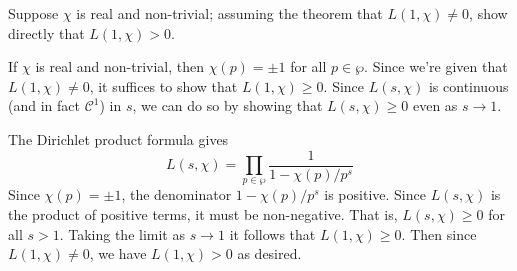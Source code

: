 \documentclass[12 pt, letterpaper]{hmcpset}
\begin{document}
\pagebreak

\begin{problem}[S \& S \S 8.4 \#12]
	Suppose $\chi$ is real and non-trivial; assuming the theorem that $L(1, \chi) \neq 0$, show directly that $L(1, \chi) > 0$.
\end{problem}

\begin{solution}
	If $\chi$ is real and non-trivial, then $\chi(p) = \pm 1$ for all $p \in \wp$. Since we're given that $L(1, \chi) \neq 0$, it suffices to show that $L(1, \chi) \ge 0$. Since $L(s, \chi)$ is continuous (and in fact $\mathcal{C}^{1}$) in $s$, we can do so by showing that $L(s, \chi) \ge 0$ even as $s \to 1$.

	The Dirichlet product formula gives
	\[
		L(s, \chi) = \prod_{p \in \wp} \frac{1}{1 - \chi(p) / p^{s}}
	\]
	Since $\chi(p) = \pm 1$, the denominator $1 - \chi (p) / p^{s}$ is positive. Since $L(s, \chi)$ is the product of positive terms, it must be non-negative. That is, $L(s, \chi) \ge 0$ for all $s > 1$. Taking the limit as $s \to 1$ it follows that $L(1, \chi) \ge 0$. Then since $L(1, \chi) \neq 0$, we have $L(1, \chi) > 0$ as desired.
\end{solution}
\end{document}
